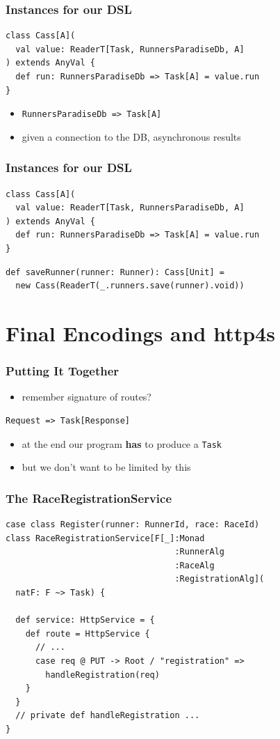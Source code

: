 \documentclass{beamer}
\begin{document}
\begin{frame}
  \frametitle{Instances for our DSL}
\begin{verbatim}
class Cass[A](
  val value: ReaderT[Task, RunnersParadiseDb, A]
) extends AnyVal {
  def run: RunnersParadiseDb => Task[A] = value.run
}
\end{verbatim}
  \begin{itemize}
  \item \texttt{RunnersParadiseDb => Task[A]}
  \item given a connection to the DB, asynchronous results
  \end{itemize}
\end{frame}

\begin{frame}
  \frametitle{Instances for our DSL}
\begin{verbatim}
class Cass[A](
  val value: ReaderT[Task, RunnersParadiseDb, A]
) extends AnyVal {
  def run: RunnersParadiseDb => Task[A] = value.run
}
\end{verbatim}
  \vfill
\begin{verbatim}
def saveRunner(runner: Runner): Cass[Unit] =
  new Cass(ReaderT(_.runners.save(runner).void))
\end{verbatim}
\end{frame}

\section{Final Encodings and http4s}

\begin{frame}[fragile]
  \frametitle{Putting It Together}
  \begin{itemize}
  \item remember signature of routes?
  \end{itemize}
\begin{verbatim}
Request => Task[Response]
\end{verbatim}
  \begin{itemize}
  \item at the end our program \textbf{has} to produce a \texttt{Task}
  \item but we don't want to be limited by this
  \end{itemize}
\end{frame}

\begin{frame}[fragile]
  \frametitle{The RaceRegistrationService}
\begin{verbatim}
case class Register(runner: RunnerId, race: RaceId)
class RaceRegistrationService[F[_]:Monad
                                  :RunnerAlg
                                  :RaceAlg
                                  :RegistrationAlg](
  natF: F ~> Task) {

  def service: HttpService = {
    def route = HttpService {
      // ...
      case req @ PUT -> Root / "registration" =>
        handleRegistration(req)
    }
  }
  // private def handleRegistration ...
}
\end{verbatim}
\end{frame}
\end{document}
